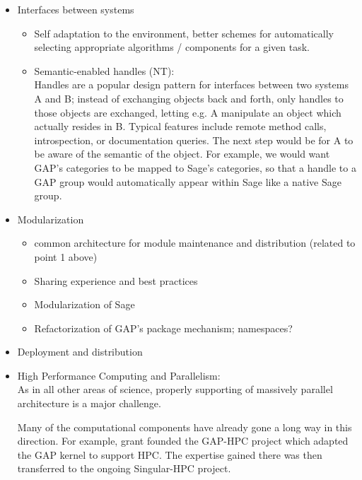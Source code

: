 \begin{Workpackage}{\thewpno}
\begin{WPDescription}
\begin{itemize}
  \item Interfaces between systems
    \begin{itemize}
    \item Self adaptation to the environment, better schemes for
      automatically selecting appropriate algorithms / components for
      a given task.
    \item Semantic-enabled handles (NT):\\
      Handles are a popular design pattern for interfaces between two
      systems A and B; instead of exchanging objects back and forth,
      only handles to those objects are exchanged, letting e.g. A
      manipulate an object which actually resides in B. Typical
      features include remote method calls, introspection, or
      documentation queries. The next step would be for A to be aware
      of the semantic of the object. For example, we would want GAP's
      categories to be mapped to Sage's categories, so that a handle
      to a GAP group would automatically appear within Sage like a
      native Sage group.
    \end{itemize}

  \item Modularization
    \begin{itemize}
    \item common architecture for module maintenance and
      distribution (related to point 1 above)
    \item Sharing experience and best practices
    \item Modularization of Sage
    \item Refactorization of GAP's package mechanism; namespaces?
    \end{itemize}

  \item Deployment and distribution
  \item High Performance Computing and Parallelism:\\
    As in all other areas of science, properly supporting of massively
    parallel architecture is a major challenge.

    Many of the computational components have already gone a long way
    in this direction. For example, grant  founded the
    GAP-HPC project which adapted the GAP kernel to support HPC. The
    expertise gained there was then transferred to the ongoing
    Singular-HPC project.


\end{itemize}
\end{WPDescription}
\end{Workpackage}
